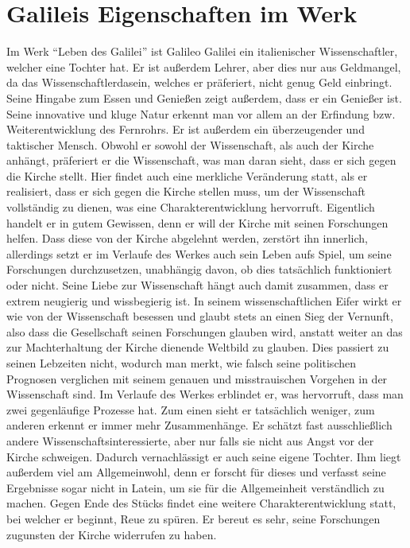 \documentclass[12pt]{scrreprt}
\begin{document}
\section{Galileis Eigenschaften im Werk}
	\label{sec:galileis eigenschaften im werk}
Im Werk \enquote{Leben des Galilei} ist Galileo Galilei ein italienischer Wissenschaftler, welcher eine Tochter hat.
Er ist außerdem Lehrer, aber dies nur aus Geldmangel, da das Wissenschaftlerdasein, welches er präferiert, nicht genug Geld einbringt.
Seine Hingabe zum Essen und Genießen zeigt außerdem, dass er ein Genießer ist.
Seine innovative und kluge Natur erkennt man vor allem an der Erfindung bzw. Weiterentwicklung des Fernrohrs.
Er ist außerdem ein überzeugender und taktischer Mensch.
Obwohl er sowohl der Wissenschaft, als auch der Kirche anhängt, präferiert er die Wissenschaft, was man daran sieht, dass er sich gegen die Kirche stellt. 
Hier findet auch eine merkliche Veränderung statt, als er realisiert, dass er sich gegen die Kirche stellen muss, um der Wissenschaft vollständig zu dienen, was eine Charakterentwicklung hervorruft.
Eigentlich handelt er in gutem Gewissen, denn er will der Kirche mit seinen Forschungen helfen.
Dass diese von der Kirche abgelehnt werden, zerstört ihn innerlich, allerdings setzt er im Verlaufe des Werkes auch sein Leben aufs Spiel, um seine Forschungen durchzusetzen, unabhängig davon, ob dies tatsächlich funktioniert oder nicht.
Seine Liebe zur Wissenschaft hängt auch damit zusammen, dass er extrem neugierig und wissbegierig ist.
In seinem wissenschaftlichen Eifer wirkt er wie von der Wissenschaft besessen und glaubt stets an einen Sieg der Vernunft, also dass die Gesellschaft seinen Forschungen glauben wird, anstatt weiter an das zur Machterhaltung der Kirche dienende Weltbild zu glauben.
Dies passiert zu seinen Lebzeiten nicht, wodurch man merkt, wie falsch seine politischen Prognosen verglichen mit seinem genauen und misstrauischen Vorgehen in der Wissenschaft sind.
Im Verlaufe des Werkes erblindet er, was hervorruft, dass man zwei gegenläufige Prozesse hat. 
Zum einen sieht er tatsächlich weniger, zum anderen erkennt er immer mehr Zusammenhänge.
Er schätzt fast ausschließlich andere Wissenschaftsinteressierte, aber nur falls sie nicht aus Angst vor der Kirche schweigen.
Dadurch vernachlässigt er auch seine eigene Tochter.
Ihm liegt außerdem viel am Allgemeinwohl, denn er forscht für dieses und verfasst seine Ergebnisse sogar nicht in Latein, um sie für die Allgemeinheit verständlich zu machen.
Gegen Ende des Stücks findet eine weitere Charakterentwicklung statt, bei welcher er beginnt, Reue zu spüren.
Er bereut es sehr, seine Forschungen zugunsten der Kirche widerrufen zu haben.
\autocite{wiki:Leben_des_Galilei}
\autocite{wiki:Leben_des_Galilei_Charakterisierungen}
\autocite{wiki:Leben_des_Galilei_Studysmarter}
\autocite{wiki:Leben_des_Galilei_Personen}
\end{document}
